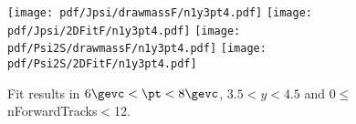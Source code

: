 \begin{figure}[H]
\begin{center}
\texttt{[image: pdf/Jpsi/drawmassF/n1y3pt4.pdf]}
\texttt{[image: pdf/Jpsi/2DFitF/n1y3pt4.pdf]}
\vspace*{-0.5cm}
\texttt{[image: pdf/Psi2S/drawmassF/n1y3pt4.pdf]}
\texttt{[image: pdf/Psi2S/2DFitF/n1y3pt4.pdf]}
\vspace*{-0.5cm}
\end{center}
\caption{Fit results in $6\gevc<\pt<8\gevc$, $3.5<y<4.5$ and 0$\leq$nForwardTracks$<$12.}
\label{Fitn1y3pt4}
\end{figure}
